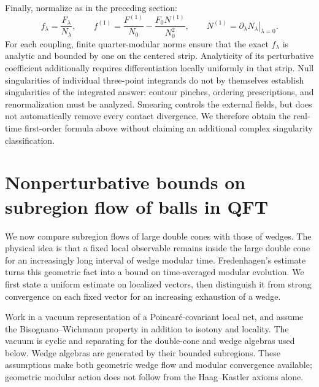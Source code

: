 \documentclass[a4paper,11pt]{article}
\theoremstyle{definition}
\begin{document}
Finally, normalize as in the preceding section:
\begin{equation}
 f_\lambda=\frac{F_\lambda}{N_\lambda},
 \qquad f^{(1)}=\frac{F^{(1)}}{N_0}-\frac{F_0N^{(1)}}{N_0^2},
 \qquad N^{(1)}=\left.\partial_\lambda N_\lambda\right|_{\lambda=0}.
 \label{eq:cpt-normalized-correction}
\end{equation}
For each coupling, finite quarter-modular norms ensure that the exact $f_\lambda$ is analytic and bounded by one on the centered strip. Analyticity of its perturbative coefficient additionally requires differentiation locally uniformly in that strip. Null singularities of individual three-point integrands do not by themselves establish singularities of the integrated answer: contour pinches, ordering prescriptions, and renormalization must be analyzed. Smearing controls the external fields, but does not automatically remove every contact divergence. We therefore obtain the real-time first-order formula above without claiming an additional complex singularity classification.

\section{Nonperturbative bounds on subregion flow of balls in QFT}\label{section:approx}

We now compare subregion flows of large double cones with those of wedges. The physical idea is that a fixed local observable remains inside the large double cone for an increasingly long interval of wedge modular time. Fredenhagen's estimate \cite{fredenhagen} turns this geometric fact into a bound on time-averaged modular evolution. We first state a uniform estimate on localized vectors, then distinguish it from strong convergence on each fixed vector for an increasing exhaustion of a wedge.

Work in a vacuum representation of a Poincar\'e-covariant local net, and assume the Bisognano--Wichmann property in addition to isotony and locality. The vacuum is cyclic and separating for the double-cone and wedge algebras used below. Wedge algebras are generated by their bounded subregions. These assumptions make both geometric wedge flow and modular convergence available; geometric modular action does not follow from the Haag--Kastler axioms alone.
\end{document}
